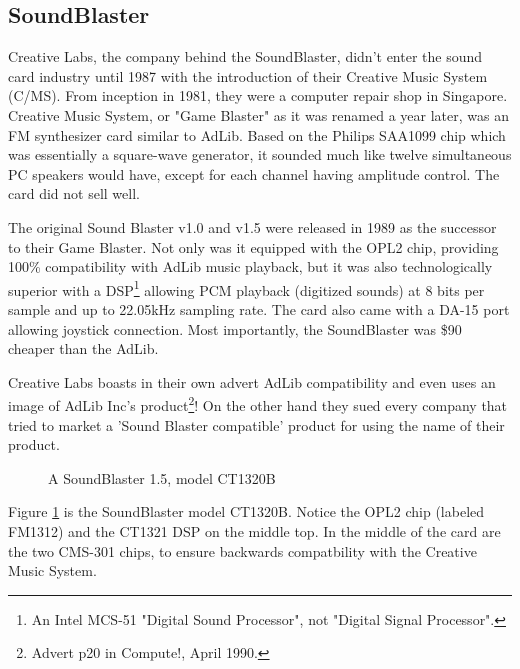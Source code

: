 \documentclass[book.tex]{subfiles}
\begin{document}
 
  


  \subsection{SoundBlaster}
  Creative Labs, the company behind the SoundBlaster, didn't enter the sound card industry until 1987 with the introduction of their Creative Music System (C/MS). From inception in 1981, they were a computer repair shop in Singapore. Creative Music System, or "Game Blaster" as it was renamed a year later, was an FM synthesizer card similar to AdLib. Based on the Philips SAA1099 chip which was essentially a square-wave generator, it sounded much like twelve simultaneous PC speakers would have, except for each channel having amplitude control. The card did not sell well.\\
  
  \par
The original Sound Blaster v1.0 and v1.5 were released in 1989 as the successor to their Game Blaster. Not only was it equipped with the OPL2 chip, providing 100\% compatibility with AdLib music playback, but it was also technologically superior with a DSP\footnote{An Intel MCS-51 "Digital Sound Processor", not "Digital Signal Processor".} allowing PCM playback (digitized sounds) at 8 bits per sample and up to 22.05kHz sampling rate. The card also came with a DA-15 port allowing joystick connection. Most importantly, the SoundBlaster was \$90 cheaper than the AdLib.\\

\par
Creative Labs boasts in their own advert AdLib compatibility and even uses an image of AdLib Inc's product\footnote{Advert p20 in Compute!, April 1990.}! On the other hand they sued every company that tried to market a 'Sound Blaster compatible' product for using the name of their product.\\

\begin{figure}[H] 
  \centering 
  \caption{A SoundBlaster 1.5, model CT1320B }
  \label{asb15}
\end{figure}

\par
Figure \ref{asb15} is the SoundBlaster model CT1320B. Notice the OPL2 chip (labeled FM1312) and the CT1321 DSP on the middle top. In the middle of the card are the two CMS-301 chips, to ensure backwards compatbility with the Creative Music System.\\
\end{document}
